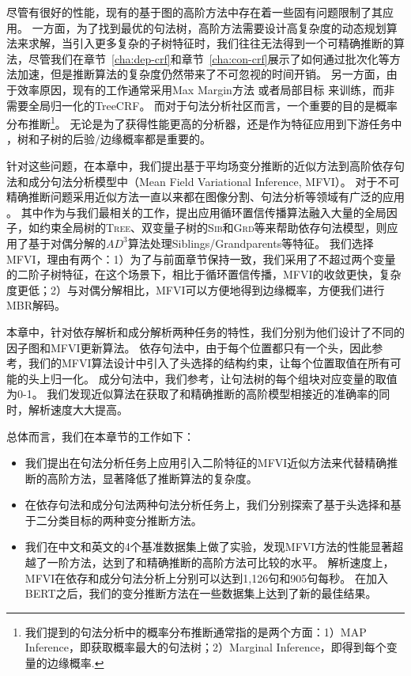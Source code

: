 尽管有很好的性能，现有的基于图的高阶方法中存在着一些固有问题限制了其应用。
一方面，为了找到最优的句法树，高阶方法需要设计高复杂度的动态规划算法来求解，当引入更多复杂的子树特征时，我们往往无法得到一个可精确推断的算法，尽管我们在章节~\ref{cha:dep-crf}和章节~\ref{cha:con-crf}展示了如何通过批次化等方法加速，但是推断算法的复杂度仍然带来了不可忽视的时间开销。
另一方面，由于效率原因，现有的工作通常采用Max Margin方法 \citep{mcdonald-pereira-2006-online}或者局部目标 \citep{ji-etal-2019-graph}来训练，而非需要全局归一化的TreeCRF。
而对于句法分析社区而言，一个重要的目的是概率分布推断\footnote{我们提到的句法分析中的概率分布推断通常指的是两个方面：1）MAP Inference，即获取概率最大的句法树；2）Marginal Inference，即得到每个变量的边缘概率.}。
无论是为了获得性能更高的分析器，还是作为特征应用到下游任务中 \citep{zhang-etal-2019-syntax,zhang-etal-2020-syntax}，树和子树的后验/边缘概率都是重要的。

针对这些问题，在本章中，我们提出基于平均场变分推断的近似方法到高阶依存句法和成分句法分析模型中（Mean Field Variational Inference, MFVI）。
对于不可精确推断问题采用近似方法一直以来都在图像分割、句法分析等领域有广泛的应用 \citep{krahenbuhl-etal-2011-efficient,wang-etal-2019-second,martins-etal-2011-dual}。
其中作为与我们最相关的工作，\citet{smith-eisner-2008-dependency,gormley-etal-2015-approximation}提出应用循环置信传播算法融入大量的全局因子，如约束全局树的\textsc{Tree}、双变量子树的\textsc{Sib}和\textsc{Grd}等来帮助依存句法模型，\citet{fonseca-martins-2020-revisiting}则应用了基于对偶分解的$AD^3$算法处理Siblings/Grandparents等特征。
我们选择MFVI，理由有两个：1）为了与前面章节保持一致，我们采用了不超过两个变量的二阶子树特征，在这个场景下，相比于循环置信传播，MFVI的收敛更快，复杂度更低；2）与对偶分解相比，MFVI可以方便地得到边缘概率，方便我们进行MBR解码。

本章中，针对依存解析和成分解析两种任务的特性，我们分别为他们设计了不同的因子图和MFVI更新算法。
依存句法中，由于每个位置都只有一个头，因此参考\citet{wang-tu-2020-second}，我们的MFVI算法设计中引入了头选择的结构约束，让每个位置取值在所有可能的头上归一化。
成分句法中，我们参考\citet{naradowsky-etal-2012-grammarless,wang-etal-2019-second,smith-eisner-2008-dependency}，让句法树的每个组块对应变量的取值为0-1。
我们发现近似算法在获取了和精确推断的高阶模型相接近的准确率的同时，解析速度大大提高。

总体而言，我们在本章节的工作如下：
\begin{itemize}
	\item 我们提出在句法分析任务上应用引入二阶特征的MFVI近似方法来代替精确推断的高阶方法，显著降低了推断算法的复杂度。
	\item 在依存句法和成分句法两种句法分析任务上，我们分别探索了基于头选择和基于二分类目标的两种变分推断方法。
	\item 我们在中文和英文的4个基准数据集上做了实验，发现MFVI方法的性能显著超越了一阶方法，达到了和精确推断的高阶方法可比较的水平。
	      解析速度上，MFVI在依存和成分句法分析上分别可以达到1,126句和905句每秒。
	      在加入BERT之后，我们的变分推断方法在一些数据集上达到了新的最佳结果。
	      
\end{itemize}


